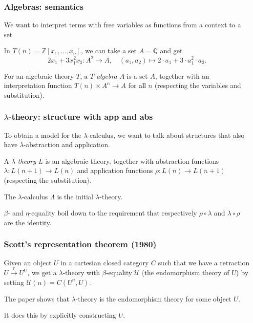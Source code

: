 \documentclass[aspectratio=169]{fancyslides} %
\begin{document}
  \begin{frame}
    \frametitle{Algebras: semantics}
    We want to interpret terms with free variables as functions from a context to a set

    \begin{example}
      In $ T(n) = \mathbb Z[x_1, \dots, x_n] $, we can take a set $ A = \mathbb Q $ and get
      \[ 2 x_1 + 3 x_1^2 x_2: A^2 \to A, \quad (a_1, a_2) \mapsto 2 \cdot a_1 + 3 \cdot a_1^2 \cdot a_2. \]
    \end{example}

    \pause

    \begin{definition}
      For an algebraic theory $ T $, a \textit{$ T $-algebra} $ A $ is a set $ A $, together with an interpretation function $ T(n) \times A^n \to A $ for all $ n $ (respecting the variables and substitution).
    \end{definition}
  \end{frame}

  \begin{frame}
    \frametitle{$ \lambda $-theory: structure with app and abs}

    To obtain a model for the $ \lambda $-calculus, we want to talk about structures that also have $ \lambda $-abstraction and application.

    \begin{definition}
      A \textit{$ \lambda $-theory} $ L $ is an algebraic theory, together with abstraction functions $ \lambda: L(n + 1) \to L(n) $ and application functions $ \rho: L(n) \to L(n + 1) $ (respecting the substitution).
    \end{definition}

    \pause

    The $ \lambda $-calculus $ \Lambda $ is the initial $ \lambda $-theory.

    \pause

    $ \beta $- and $ \eta $-equality boil down to the requirement that respectively $ \rho \circ \lambda $ and $ \lambda \circ \rho $ are the identity.
  \end{frame}

  \begin{frame}
    \frametitle{Scott's representation theorem (1980)}

    Given an object $ U $ in a cartesian closed category $ C $ such that we have a retraction $ U \xrightarrow{r} U^U $, we get a $ \lambda $-theory with $ \beta $-equality $ \mathcal U $ (the endomorphism theory of $ U $) by setting $ \mathcal U(n) = C(U^n, U) $.

    \pause

    The paper shows that $ \lambda $-theory is the endomorphism theory for some object $ U $.

    \pause

    It does this by explicitly constructing $ U $.
  \end{frame}
\end{document}
